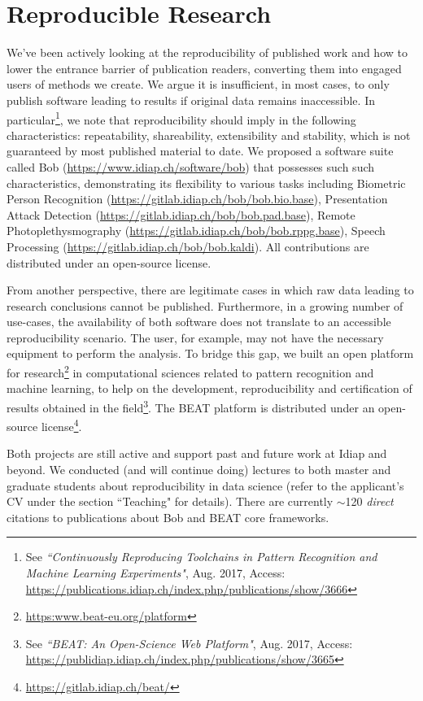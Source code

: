 \documentclass[a4paper,10pt,onecolumn]{article}
\begin{document}
\section{Reproducible Research}

We've been actively looking at the reproducibility of published work and how to
lower the entrance barrier of publication readers, converting them into engaged
users of methods we create.  We argue it is insufficient, in most cases, to
only publish software leading to results if original data remains inaccessible.
In particular\footnote{See \textit{``Continuously Reproducing Toolchains in
Pattern Recognition and Machine Learning Experiments"}, Aug. 2017, Access:
\url{https://publications.idiap.ch/index.php/publications/show/3666}}, we note
that reproducibility should imply in the following characteristics:
repeatability, shareability, extensibility and stability, which is not
guaranteed by most published material to date.  We proposed a software suite
called Bob (\url{https://www.idiap.ch/software/bob}) that possesses such such
characteristics, demonstrating its flexibility to various tasks including
Biometric Person Recognition (\url{https://gitlab.idiap.ch/bob/bob.bio.base}),
Presentation Attack Detection (\url{https://gitlab.idiap.ch/bob/bob.pad.base}),
Remote Photoplethysmography (\url{https://gitlab.idiap.ch/bob/bob.rppg.base}),
Speech Processing (\url{https://gitlab.idiap.ch/bob/bob.kaldi}).  All
contributions are distributed under an open-source license.

From another perspective, there are legitimate cases in which raw data leading
to research conclusions cannot be published.  Furthermore, in a growing number
of use-cases, the availability of both software does not translate to an
accessible reproducibility scenario.  The user, for example, may not have the
necessary equipment to perform the analysis.  To bridge this gap, we built an
open platform for research\footnote{\url{https:www.beat-eu.org/platform}} in
computational sciences related to pattern recognition and machine learning, to
help on the development, reproducibility and certification of results obtained
in the field\footnote{See \textit{``BEAT: An Open-Science Web Platform"}, Aug.
2017, Access:
\url{https://publidiap.idiap.ch/index.php/publications/show/3665}}.  The BEAT
platform is distributed under an open-source
license\footnote{\url{https://gitlab.idiap.ch/beat/}}.

Both projects are still active and support past and future work at Idiap and
beyond.  We conducted (and will continue doing) lectures to both master and
graduate students about reproducibility in data science (refer to the
applicant's CV under the section ``Teaching" for details).  There are currently
$\sim$120 \textit{direct} citations to publications about Bob and BEAT core
frameworks.
\end{document}
